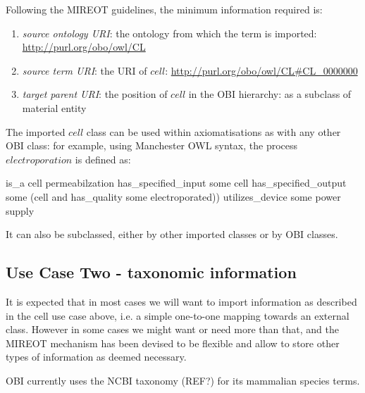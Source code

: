 \documentclass{elsart3p}    %
\def\sourcetabsize{4}
\newenvironment{sourcestyle}{\begin{scriptsize}}{\end{scriptsize}}
\begin{document}
Following the MIREOT guidelines, the minimum information required is:  

\begin{enumerate}
\item \textit{source ontology URI}: the ontology from which the term is imported: \url{http://purl.org/obo/owl/CL}
\item \textit{source term URI}: the URI of $cell$: \url{http://purl.org/obo/owl/CL#CL_0000000}
\item \textit{target parent URI}: the position of $cell$ in the OBI hierarchy: as a subclass of material entity %
\end{enumerate}

The imported $cell$ class can be used within axiomatisations as with any other OBI class: for example, using Manchester OWL syntax, the process $electroporation$ is defined as:


\begin{sourcestyle}%
\begin{verbatimtab}[\sourcetabsize]
     is_a cell permeabilzation
     has_specified_input some cell
     has_specified_output some 
	    (cell and has_quality some electroporated))
     utilizes_device some power supply

\end{verbatimtab}%
\end{sourcestyle}


It can also be subclassed, either by other imported classes or by OBI classes.

\subsection*{Use Case Two - taxonomic information}

It is expected that in most cases we will want to import information as described in the cell use case above, i.e. a simple one-to-one mapping towards an external class. However in some cases we might want or need more than that, and the MIREOT mechanism has been devised to be flexible and allow to store other types of information as deemed necessary.

OBI currently uses the NCBI taxonomy (REF?) for its mammalian species terms. 
\end{document}

